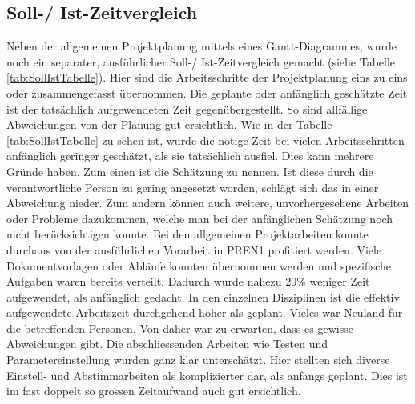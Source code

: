 \subsection{Soll-/ Ist-Zeitvergleich}
\label{sec:SollIstVergleich}
Neben der allgemeinen Projektplanung mittels eines Gantt-Diagrammes, wurde noch ein separater, 
ausführlicher Soll-/ Ist-Zeitvergleich gemacht (siehe Tabelle \ref{tab:SollIstTabelle}). 
Hier sind die Arbeitsschritte der  Projektplanung eins zu eins oder zusammengefasst übernommen. 
Die geplante oder anfänglich geschätzte  Zeit ist der tatsächlich aufgewendeten Zeit 
gegenübergestellt. So sind allfällige Abweichungen von  der Planung gut ersichtlich. Wie in 
der Tabelle \ref{tab:SollIstTabelle} zu sehen ist, wurde die nötige Zeit bei vielen 
Arbeitsschritten anfänglich geringer geschätzt, als sie tatsächlich ausfiel. Dies kann mehrere 
Gründe haben. Zum einen ist die Schätzung zu nennen. Ist diese durch die verantwortliche 
Person zu gering angesetzt worden, schlägt sich das in einer Abweichung nieder. Zum andern 
können auch weitere, unvorhergesehene Arbeiten oder Probleme dazukommen, welche man bei der 
anfänglichen Schätzung noch nicht berücksichtigen konnte. Bei den allgemeinen Projektarbeiten 
konnte durchaus von der ausführlichen Vorarbeit in PREN1 profitiert werden. Viele Dokumentvorlagen 
oder Abläufe konnten übernommen werden und spezifische Aufgaben waren bereits verteilt. Dadurch 
wurde nahezu 20\% weniger Zeit aufgewendet, als anfänglich gedacht. In den einzelnen Disziplinen 
ist die effektiv aufgewendete Arbeitszeit durchgehend höher als geplant. Vieles war Neuland für 
die betreffenden Personen. Von daher war zu erwarten, dass es gewisse Abweichungen gibt. Die 
abschliessenden Arbeiten wie Testen und Parametereinstellung wurden ganz klar unterschätzt. 
Hier stellten sich diverse Einstell- und Abstimmarbeiten als komplizierter dar, als anfangs 
geplant. Dies ist im fast doppelt so grossen Zeitaufwand auch gut ersichtlich. 
